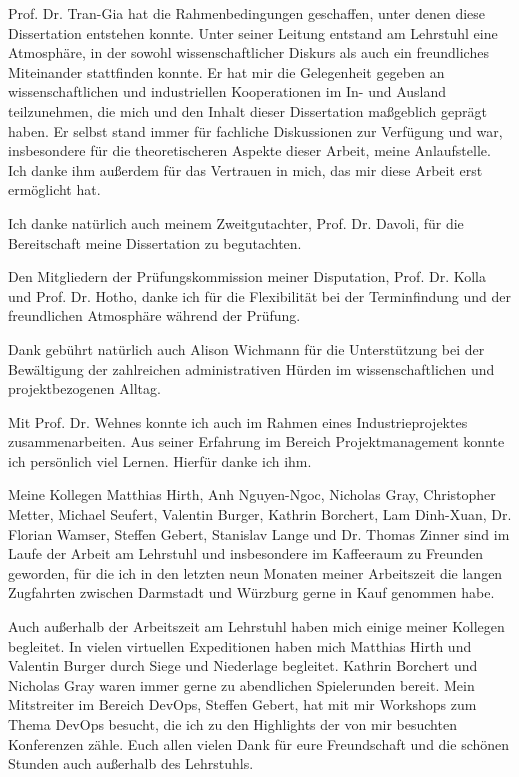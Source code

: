 Prof. Dr. Tran-Gia hat die Rahmenbedingungen geschaffen, unter denen diese Dissertation entstehen konnte.
Unter seiner Leitung entstand am Lehrstuhl eine Atmosphäre, in der sowohl wissenschaftlicher Diskurs als auch ein freundliches Miteinander stattfinden konnte.
Er hat mir die Gelegenheit gegeben an wissenschaftlichen und industriellen Kooperationen im In- und Ausland teilzunehmen, die mich und den Inhalt dieser Dissertation maßgeblich geprägt haben.
Er selbst stand immer für fachliche Diskussionen zur Verfügung und war, insbesondere für die theoretischeren Aspekte dieser Arbeit, meine Anlaufstelle.
Ich danke ihm außerdem für das Vertrauen in mich, das mir diese Arbeit erst ermöglicht hat. %

Ich danke natürlich auch meinem Zweitgutachter, Prof. Dr. Davoli, für die Bereitschaft meine Dissertation zu begutachten. %

Den Mitgliedern der Prüfungskommission meiner Disputation, Prof. Dr. Kolla und Prof. Dr. Hotho, danke ich für die Flexibilität bei der Terminfindung und der freundlichen Atmosphäre während der Prüfung. %

Dank gebührt natürlich auch Alison Wichmann für die Unterstützung bei der Bewältigung der zahlreichen administrativen Hürden im wissenschaftlichen und projektbezogenen Alltag. %

Mit Prof. Dr. Wehnes konnte ich auch im Rahmen eines Industrieprojektes zusammenarbeiten. Aus seiner Erfahrung im Bereich Projektmanagement konnte ich persönlich viel Lernen.
Hierfür danke ich ihm. %

Meine Kollegen Matthias Hirth,  Anh Nguyen-Ngoc, Nicholas Gray, Christopher Metter, Michael Seufert, Valentin Burger, Kathrin Borchert, Lam Dinh-Xuan, Dr. Florian Wamser, Steffen Gebert, Stanislav Lange und Dr. Thomas Zinner sind im Laufe der Arbeit am Lehrstuhl und insbesondere im Kaffeeraum zu Freunden geworden, für die ich in den letzten neun Monaten meiner Arbeitszeit die langen Zugfahrten zwischen Darmstadt und Würzburg gerne in Kauf genommen habe. %

Auch außerhalb der Arbeitszeit am Lehrstuhl haben mich einige meiner Kollegen begleitet.
In vielen virtuellen Expeditionen haben mich Matthias Hirth und Valentin Burger durch Siege und Niederlage begleitet. %
Kathrin Borchert und Nicholas Gray waren immer gerne zu abendlichen Spielerunden bereit.
Mein Mitstreiter im Bereich DevOps, Steffen Gebert, hat mit mir Workshops zum Thema DevOps besucht, die ich zu den Highlights der von mir besuchten Konferenzen zähle.  
Euch allen vielen Dank für eure Freundschaft und die schönen Stunden auch außerhalb des Lehrstuhls. %

